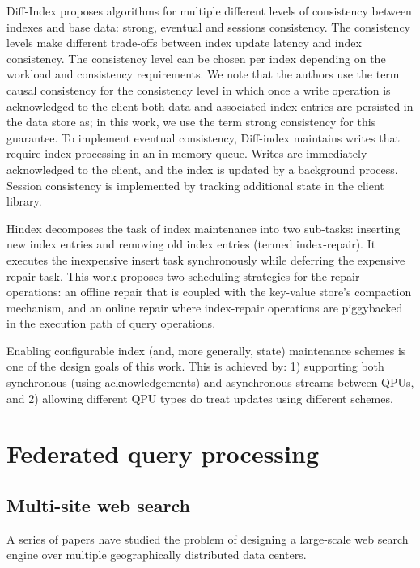 Diff-Index \cite{tan:diffindex} proposes algorithms for multiple different levels of consistency between indexes and base data:
strong, eventual and sessions consistency.
The consistency levels make different trade-offs between index update latency and index consistency.
The consistency level can be chosen per index depending on the workload and consistency requirements.
We note that the authors use the term causal consistency for the consistency level in which once a write operation is
acknowledged to the client both data and associated index entries are persisted in the data store as;
in this work, we use the term strong consistency for this guarantee.
To implement eventual consistency, Diff-index maintains writes that require index processing in an in-memory queue.
Writes are immediately acknowledged to the client, and the index is updated by a background process.
Session consistency is implemented by tracking additional state in the client library.

Hindex \cite{tang:deferredindexing} decomposes the task of index maintenance into two sub-tasks:
inserting new index entries and removing old index entries (termed index-repair).
It executes the inexpensive insert task synchronously while deferring the expensive repair task.
This work proposes two scheduling strategies for the repair operations:
an offline repair that is coupled with the key-value store’s compaction mechanism,
and an online repair where index-repair operations are piggybacked in the execution path of query operations.

\bibskip
\noindent

Enabling configurable index (and, more generally, state) maintenance schemes is one of the design goals of this work.
This is achieved by: 1) supporting both synchronous (using acknowledgements) and asynchronous streams between QPUs,
and 2) allowing different QPU types do treat updates using different schemes.


\section{Federated query processing}
\label{sec:federation}
\subsection{Multi-site web search}
A series of papers \cite{cambazoglu:multisitequantifying, yates:multisitefeasibility, cambazoglu:multisiteforwarding, frances:multisiteefficiency, kayaaslan:multisitereplication}
have studied the problem of designing a large-scale web search engine over multiple geographically distributed data centers.

